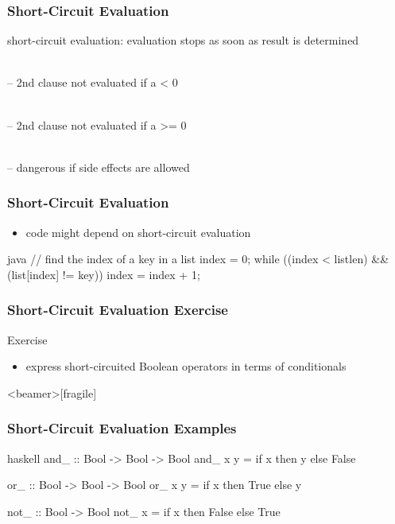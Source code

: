 \documentclass[dvipsnames]{beamer}
\theoremstyle{plain}
\begin{document}
\begin{frame}
  \frametitle{Short-Circuit Evaluation}

  \begin{definition}
    \alert{short-circuit evaluation}: evaluation stops
      as soon as result is determined
  \end{definition}

  \pause
  \begin{example}
    \\
    -- 2nd clause not evaluated if a < 0

    \bigskip
    \\
    -- 2nd clause not evaluated if a >= 0

    \pause
    \bigskip
    \\
    -- dangerous if side effects are allowed
  \end{example}
\end{frame}

\begin{frame}[fragile]
  \frametitle{Short-Circuit Evaluation}

  \begin{itemize}
    \item code might depend on short-circuit evaluation
  \end{itemize}

  \begin{example}[Java]
    \begin{pygments}{java}
// find the index of a key in a list
index = 0;
while ((index < listlen) && (list[index] != key))
    index = index + 1;
    \end{pygments}
  \end{example}
\end{frame}

\begin{frame}
  \frametitle{Short-Circuit Evaluation Exercise}

  \begin{block}{Exercise}
    \begin{itemize}
      \item express short-circuited Boolean operators in terms of conditionals
    \end{itemize}
  \end{block}
\end{frame}

\begin{frame}<beamer>[fragile]
  \frametitle{Short-Circuit Evaluation Examples}

  \begin{example}[Haskell]
    \begin{pygments}{haskell}
and_ :: Bool -> Bool -> Bool
and_ x y = if x then y else False

or_ :: Bool -> Bool -> Bool
or_ x y = if x then True else y

not_ :: Bool -> Bool
not_ x = if x then False else True
    \end{pygments}
  \end{example}
\end{frame}
\end{document}
